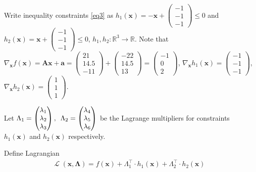 \documentclass[fleqn]{article}
\newcommand{\mat}[1]{\mathbf{#1}}
\newcommand{\tr}{^\intercal}
\newcommand{\real}{\mathbb{R}}
\newcommand{\vect}[1]{\begin{pmatrix}#1\end{pmatrix}}
\newcommand{\nablax}{\nabla_{\!\mat x}}
\DeclareMathOperator{\Lagr}{\mathcal{L}}
\begin{document}
Write inequality constraints \eqref{eq3} as 
$h_1(\mat x)=-\mat x+\begin{pmatrix} -1\\-1\\-1 \end{pmatrix}\leq 0$
and
$h_2(\mat x)=\mat x+\begin{pmatrix} -1\\-1\\-1 \end{pmatrix}\leq 0$,
$h_1, h_2:\real^3\rightarrow\real$.
Note that
$\nablax f(\mat x)=\mat A\mat x + \mat a=
  \vect{21\\14.5\\-11} + \vect{-22\\14.5\\13} = \vect{-1\\0\\2}$,
$\nablax h_1(\mat x)=\vect{-1\\-1\\-1}$, 
$\nablax h_2(\mat x)=\vect{1\\1\\1}$.

Let $
\Lambda_1=\begin{pmatrix}\lambda_1\\ \lambda_2\\ \lambda_3\end{pmatrix},\enskip 
\Lambda_2=\begin{pmatrix}\lambda_4\\ \lambda_5\\ \lambda_6\end{pmatrix}$ be the Lagrange multipliers
for constraints $h_1(\mat x)$ and $h_2(\mat x)$ respectively.

Define Lagrangian
\begin{gather}
\Lagr(\mat x, \mat\Lambda)=f(\mat x)+ \Lambda_1\tr\cdot h_1(\mat x) + 
  \Lambda_2\tr\cdot h_2(\mat x)
\end{gather}

\end{document}
